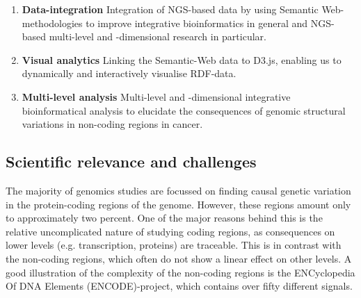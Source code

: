 \documentclass[twoside,fontsize=10pt]{article}
\begin{document}
\begin{enumerate}
\item \textbf{Data-integration} 
Integration of NGS-based data by using Semantic Web-methodologies to improve integrative bioinformatics in general and NGS-based multi-level and -dimensional research in particular.
\item \textbf{Visual analytics} 
Linking the Semantic-Web data to D3.js, enabling us to dynamically and interactively visualise RDF-data.
\item \textbf{Multi-level analysis} 
Multi-level and -dimensional integrative bioinformatical analysis to elucidate the consequences of genomic structural variations in non-coding regions in cancer.
\end{enumerate}
\subsection*{Scientific relevance and challenges} %
The majority of genomics studies are focussed on finding causal genetic variation in the protein-coding regions of the genome. However, these regions amount only to approximately two percent\cite{Lander2001}. One of the major reasons behind this is the relative uncomplicated nature of studying coding regions, as consequences on lower levels (e.g. transcription, proteins) are traceable\cite{McLaren2010}. This is in contrast with the non-coding regions, which often do not show a linear effect on other levels. A good illustration of the complexity of the non-coding regions is the ENCyclopedia Of DNA Elements (ENCODE)-project\cite{ENCODE}, which contains over fifty different signals. 
\end{document}
